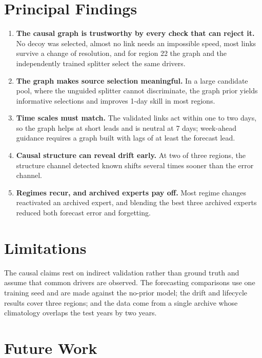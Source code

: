 \section{Principal Findings}
\label{sec:conc-findings}

\begin{enumerate}
  \item \textbf{The causal graph is trustworthy by every check that can reject it.} No decoy was selected, almost no link needs an impossible speed, most links survive a change of resolution, and for region 22 the graph and the independently trained splitter select the same drivers.
  \item \textbf{The graph makes source selection meaningful.} In a large candidate pool, where the unguided splitter cannot discriminate, the graph prior yields informative selections and improves 1-day skill in most regions.
  \item \textbf{Time scales must match.} The validated links act within one to two days, so the graph helps at short leads and is neutral at 7 days; week-ahead guidance requires a graph built with lags of at least the forecast lead.
  \item \textbf{Causal structure can reveal drift early.} At two of three regions, the structure channel detected known shifts several times sooner than the error channel.
  \item \textbf{Regimes recur, and archived experts pay off.} Most regime changes reactivated an archived expert, and blending the best three archived experts reduced both forecast error and forgetting.
\end{enumerate}

\section{Limitations}
\label{sec:conc-limitations}

The causal claims rest on indirect validation rather than ground truth and assume that common drivers are observed. The forecasting comparisons use one training seed and are made against the no-prior model; the drift and lifecycle results cover three regions; and the data come from a single archive whose climatology overlaps the test years by two years.

\section{Future Work}
\label{sec:conc-future}

